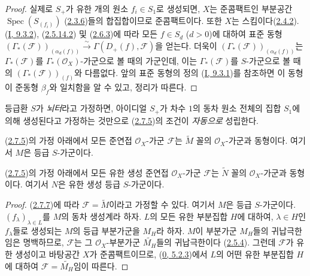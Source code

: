 \begin{proof}
실제로 $S_+$가 유한 개의 원소 $f_i\in S_1$로 생성되면, $X$는 준콤팩트인
부분공간 $\operatorname{Spec}(S_{(f_i)})$
(\hyperref[II.2.3.6-ko]{2.3.6})들의 합집합이므로 준콤팩트이다. 또한 $X$는
스킴이다(\hyperref[II.2.4.2-ko]{2.4.2}).
(\hyperref[I.9.3.2-ko]{I, 9.3.2}),
(\hyperref[II.2.5.14.2-ko]{2.5.14.2}) 및
(\hyperref[II.2.6.3-ko]{2.6.3})에 따라 모든 $f\in S_d$ ($d>0$)에 대하여
표준 동형
$(\Gamma_*(\mathcal{F}))_{(\alpha_d(f))}\xrightarrow{\sim}
\Gamma(D_+(f),\mathcal{F})$을 얻는다. 더욱이
$(\Gamma_*(\mathcal{F}))_{(\alpha_d(f))}$는
$\Gamma_*(\mathcal{F})$를 $\Gamma_*(\mathcal{O}_X)$-가군으로 볼 때의
가군인데, 이는 $\Gamma_*(\mathcal{F})$를 $S$-가군으로 볼 때의
$(\Gamma_*(\mathcal{F}))_{(f)}$와 다름없다. 앞의 표준 동형의 정의
(\hyperref[I.9.3.1-ko]{I, 9.3.1})를 참조하면 이 동형이 준동형
$\beta_f$와 일치함을 알 수 있고, 정리가 따른다.
\end{proof}

\begin{remark}[2.7.6]
\label{II.2.7.6-ko}
등급환 $S$가 \emph{뇌터}라고 가정하면, 아이디얼 $S_+$가 차수 $1$의 동차
원소 전체의 집합 $S_1$에 의해 생성된다고 가정하는 것만으로
(\hyperref[II.2.7.5-ko]{2.7.5})의 조건이 \emph{자동으로} 성립한다.
\end{remark}

\begin{corollary}[2.7.7]
\label{II.2.7.7-ko}
(\hyperref[II.2.7.5-ko]{2.7.5})의 가정 아래에서 모든 준연접
$\mathcal{O}_X$-가군 $\mathcal{F}$는 $\widetilde{M}$ 꼴의
$\mathcal{O}_X$-가군과 동형이다. 여기서 $M$은 등급 $S$-가군이다.
\end{corollary}

\begin{corollary}[2.7.8]
\label{II.2.7.8-ko}
(\hyperref[II.2.7.5-ko]{2.7.5})의 가정 아래에서 모든 유한 생성 준연접
$\mathcal{O}_X$-가군 $\mathcal{F}$는 $\widetilde{N}$ 꼴의
$\mathcal{O}_X$-가군과 동형이다. 여기서 $N$은 유한 생성 등급
$S$-가군이다.
\end{corollary}

\begin{proof}
(\hyperref[II.2.7.7-ko]{2.7.7})에 따라 $\mathcal{F}=\widetilde{M}$이라고
가정할 수 있다. 여기서 $M$은 등급 $S$-가군이다.
$(f_\lambda)_{\lambda\in L}$를 $M$의 동차 생성계라 하자. $L$의 모든 유한
부분집합 $H$에 대하여, $\lambda\in H$인 $f_\lambda$들로 생성되는 $M$의
등급 부분가군을 $M_H$라 하자. $M$이 부분가군 $M_H$들의 귀납극한임은
명백하므로, $\mathcal{F}$는 그 $\mathcal{O}_X$-부분가군
$\widetilde{M_H}$들의 귀납극한이다
(\hyperref[II.2.5.4-ko]{2.5.4}). 그런데 $\mathcal{F}$가 유한 생성이고
바탕공간 $X$가 준콤팩트이므로, (\hyperref[0.5.2.3-ko]{0, 5.2.3})에서
$L$의 어떤 유한 부분집합 $H$에 대하여
$\mathcal{F}=\widetilde{M_H}$임이 따른다.
\end{proof}

